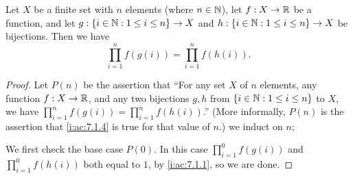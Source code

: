 \begin{ac}\label{i:ac:7.1.4}
  Let \(X\) be a finite set with \(n\) elements (where \(n \in \mathbb{N}\)), let \(f : X \to \mathbb{R}\) be a function, and let \(g : \left\lbrace i \in \mathbb{N} : 1 \leq i \leq n\right\rbrace \to X\) and \(h : \left\lbrace i \in \mathbb{N} : 1 \leq i \leq n\right\rbrace \to X\) be bijections.
  Then we have
  \[
    \prod_{i = 1}^n f(g(i)) = \prod_{i = 1}^n f(h(i)).
  \]
\end{ac}

\begin{proof}
  Let \(P(n)\) be the assertion that ``For any set \(X\) of \(n\) elements, any function \(f : X \to \mathbb{R}\), and any two bijections \(g, h\) from \(\left\lbrace i \in \mathbb{N} : 1 \leq i \leq n\right\rbrace\) to \(X\), we have \(\prod_{i = 1}^n f(g(i)) = \prod_{i = 1}^n f(h(i))\).''
  (More informally, \(P(n)\) is the assertion that \cref{i:ac:7.1.4} is true for that value of \(n\).)
  we induct on \(n\);

  We first check the base case \(P(0)\).
  In this case \(\prod_{i = 1}^0 f(g(i))\) and \(\prod_{i = 1}^0 f(h(i))\) both equal to \(1\), by \cref{i:ac:7.1.1}, so we are done.


\end{proof}
